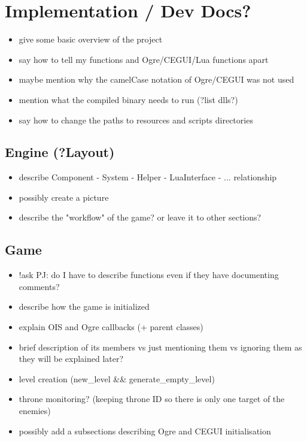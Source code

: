 \chapter{Implementation / Dev Docs?}

\begin{itemize}
    \item give some basic overview of the project
    \item say how to tell my functions and Ogre/CEGUI/Lua functions apart
    \item maybe mention why the camelCase notation of Ogre/CEGUI was not used
    \item mention what the compiled binary needs to run (?list dlls?)
    \item say how to change the paths to resources and scripts directories
\end{itemize}

\section{Engine (?Layout)}

\begin{itemize}
    \item describe Component - System - Helper - LuaInterface - ... relationship
    \item possibly create a picture
    \item describe the "workflow" of the game? or leave it to other sections?
\end{itemize}

\section{Game}

\begin{itemize}
    \item !ask PJ: do I have to describe functions even if they have documenting comments? 
    \item describe how the game is initialized
    \item explain OIS and Ogre callbacks (+ parent classes)
    \item brief description of its members vs just mentioning them vs ignoring them as they will be explained later?
    \item level creation (new\_level \&\& generate\_empty\_level)
    \item throne monitoring? (keeping throne ID so there is only one target of the enemies)
    \item possibly add a subsections describing Ogre and CEGUI initialisation
\end{itemize}

